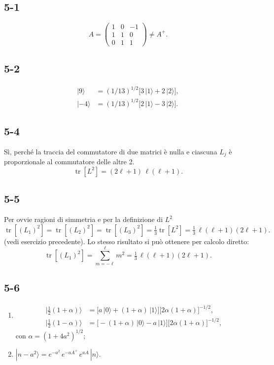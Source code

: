 \documentclass[11pt, a4paper]{book}
\numberwithin{equation}{section}
\begin{document}
\subsection*{5-1}
\[
A =
\begin{pmatrix}
1 & 0 & -1 \\
1 & 1 &  0 \\
0 & 1 &  1
\end{pmatrix}
\neq A^+.
\]

\subsection*{5-2}
\begin{align*}
|9\rangle &= (1/13)^{1/2}\bigl[3\,|1\rangle + 2\,|2\rangle\bigr], \\
|-4\rangle &= (1/13)^{1/2}\bigl[2\,|1\rangle - 3\,|2\rangle\bigr].
\end{align*}


\subsection*{5-4}
Sì, perché la traccia del commutatore di due matrici è nulla e
ciascuna $L_j$ è proporzionale al commutatore delle altre 2.
\[
\operatorname{tr}[L^2] = (2\ell+1)\,\ell(\ell+1).
\]

\subsection*{5-5}
Per ovvie ragioni di simmetria e per la definizione di $L^2$
\[
\operatorname{tr}[(L_1)^2]
= \operatorname{tr}[(L_2)^2]
= \operatorname{tr}[(L_3)^2]
= \tfrac{1}{3}\operatorname{tr}[L^2]
= \tfrac{1}{3}\,\ell(\ell+1)(2\ell+1).
\]
(vedi esercizio precedente). Lo stesso risultato si può ottenere per
calcolo diretto:
\[
\operatorname{tr}[(L_1)^2] = \sum_{m=-\ell}^{\ell} m^2
= \tfrac{1}{3}\,\ell(\ell+1)(2\ell+1).
\]

\subsection*{5-6}
\begin{enumerate}
  \item
    \begin{align*}
    \bigl|\tfrac{1}{2}(1+\alpha)\bigr\rangle
      &= \bigl[a\,|0\rangle + (1+\alpha)\,|1\rangle\bigr]
         \bigl[2\alpha(1+\alpha)\bigr]^{-1/2}, \\
    \bigl|\tfrac{1}{2}(1-\alpha)\bigr\rangle
      &= \bigl[-(1+\alpha)\,|0\rangle - a\,|1\rangle\bigr]
         \bigl[2\alpha(1+\alpha)\bigr]^{-1/2},
    \end{align*}
    con $\alpha = (1+4a^2)^{1/2}$;
  \item[*ii)]
    $|n-a^2\rangle = e^{-a^2}\,e^{-aA^+}\,e^{aA}\,|n\rangle$.
\end{enumerate}
\end{document}
